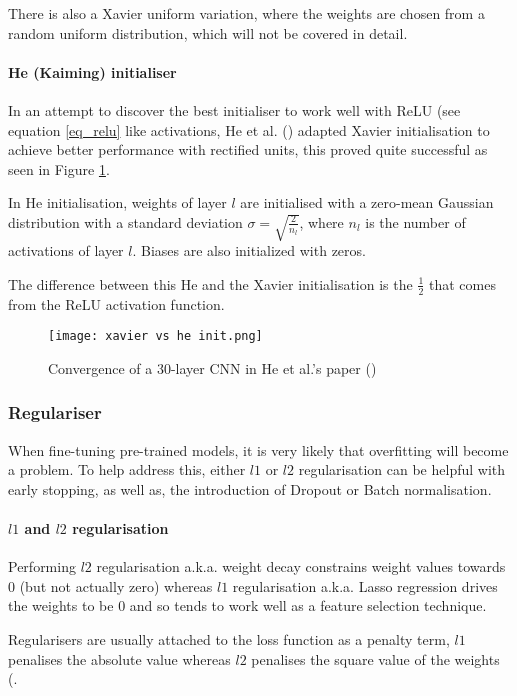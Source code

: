 There is also a Xavier uniform variation, where the weights are chosen from a random uniform distribution, which will not be covered in detail.
\paragraph{He (Kaiming) initialiser} In an attempt to discover the best initialiser to work well with \gls{ReLU} (see equation \ref{eq_relu} like activations, He et al. (\cite{He_2015_ICCV}) adapted Xavier initialisation to achieve better performance with rectified units, this proved quite successful as seen in Figure \ref{fig_he_xavier}.

In He initialisation, weights of layer $l$ are initialised with a zero-mean Gaussian distribution with a standard deviation $\sigma =\sqrt{\frac{2}{n_l}}$, where $n_l$ is the number of activations of layer $l$. Biases are also initialized with zeros. 

The difference between this He and the Xavier initialisation is the $\frac{1}{2}$ that comes from the \gls{ReLU} activation function.


\begin{figure}[hbt!]
    \centering
    \texttt{[image: xavier vs he init.png]}
    \caption{Convergence of a 30-layer \gls{CNN} in He et al.'s paper (\cite{He_2015_ICCV})}
    \label{fig_he_xavier}
\end{figure}
\subsubsection{Regulariser} \label{regulariser}
When fine-tuning pre-trained models, it is very likely that overfitting will become a problem. To help address this, either $l1$ or $l2$ regularisation can be helpful with early stopping, as well as, the introduction of Dropout or Batch normalisation.
\paragraph{$l1$ and $l2$ regularisation}
Performing $l2$ regularisation \gls{a.k.a.} weight decay constrains weight values towards 0 (but not actually zero) whereas $l1$ regularisation \gls{a.k.a.} Lasso regression drives the weights to be $0$ and so tends to work well as a feature selection technique. 

Regularisers are usually attached to the loss function as a penalty term, $l1$ penalises the absolute value whereas $l2$ penalises the square value of the weights (\cite{shanmugamani2018deep}. 

